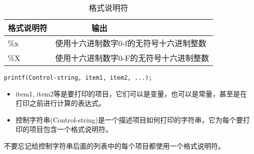 \begin{frame}[fragile]\ft{\secname}
\begin{table}
\centering
\caption{格式说明符}
\begin{tabular}{p{2.5cm}|p{7.5cm}} \hline
格式说明符 & ~~~~~~~~输出 \\ \hline\hline 
\%x & 使用十六进制数字0-f的无符号十六进制整数\\
\%X & 使用十六进制数字0-F的无符号十六进制整数\\
\hline
\end{tabular}
\end{table}
\end{frame}

\begin{frame}[fragile]\ft{\secname}
\begin{lstlisting}[title=printf的使用格式]
printf(Control-string, item1, item2, ...);
\end{lstlisting} \vspace{0.1in}

\begin{itemize}
\item item1, item2等是要打印的项目，它们可以是变量，也可以是常量，甚至是在打印之前进行计算的表达式。\\[0.1in]
\item 控制字符串(Control-string)是一个描述项目如何打印的字符串，它为每个要打印的项目包含一个格式说明符。

\end{itemize}
\end{frame}

\begin{frame}[fragile]\ft{\secname}
\begin{figure}
\centering
{}
\end{figure}
\end{frame}

\begin{frame}[fragile]\ft{\secname}
不要忘记给控制字符串后面的列表中的每个项目都使用一个格式说明符。
\end{frame}

